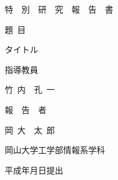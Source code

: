 \pagestyle{empty}

\begin{titlepage}

\vspace*{1cm}

\begin{center}


特\ \ 別\ \ 研\ \ 究\ \ 報\ \ 告\ \ 書

\vspace*{0.8cm}

題\ 目

\vspace*{1cm}

{\large{タイトル}}

\vspace*{-0.3cm}

\underline{\hspace*{12cm}}

\vspace*{3cm}

指導教員

\vspace*{0.3cm}

{\large{竹~内~~孔~一}}

\vspace*{-0.3cm}

\underline{\hspace*{4cm}}

\vspace*{3cm}

報~~告~~者

\vspace*{0.3cm}

{\large{岡~大~~太~郎}}

\vspace*{-0.3cm}

\underline{\hspace*{4cm}}

\vspace*{0.5cm}

岡山大学工学部情報系学科

\vspace*{2cm}

平成年月日提出





\end{center}
\end{titlepage}
\newpage
